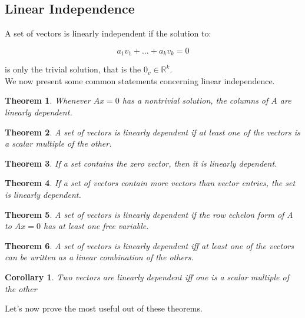 \documentclass{article}
\newtheorem{thm}{Theorem}[subsection]
\newtheorem{cor}{Corollary}[subsection]
\numberwithin{equation}{subsection}
\begin{document}
\subsection{Linear Independence}
A set of vectors is linearly independent if the solution to:

\begin{equation*}
    a_{1}v_{1} + \ldots + a_{k}v_{k} = 0
\end{equation*}

is only the trivial solution, that is the $0_{v} \in \mathbb{R}^{k}$.
\\
We now present some common statements concerning linear independence. 
\begin{tcolorbox}
  \begin{thm}
    Whenever $Ax=0$ has a nontrivial solution, the columns of $A$ are linearly dependent. 
    \end{thm}
    
    \begin{thm}
    A set of vectors is linearly dependent if at least one of the vectors is a scalar multiple of the other.
    \end{thm}
    
    \begin{thm}
    If a set contains the zero vector, then it is linearly dependent.
    \end{thm}
    
    \begin{thm}
    If a set of vectors contain more vectors than vector entries, the set is linearly dependent.
    \end{thm}
    
    \begin{thm}
    A set of vectors is linearly dependent if the row echelon form of A to $Ax=0$ has at least one free variable.
    \end{thm}
    
\begin{thm}
\label{comb}
A set of vectors is linearly dependent iff at least one of the vectors can be written as a linear combination of the others.
\end{thm}

\begin{cor}
Two vectors are linearly dependent iff one is a scalar multiple of the other
\end{cor}

\end{tcolorbox}
Let's now prove the most useful out of these theorems. 
\end{document}
